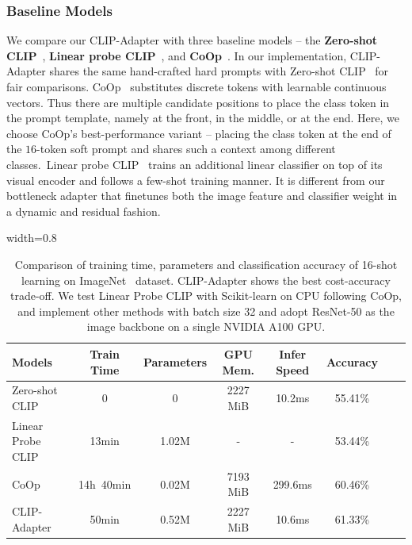 \documentclass[default,iicol]{sn-jnl}%
\theoremstyle{thmstyleone}%
\theoremstyle{thmstyletwo}%
\theoremstyle{thmstylethree}%
\begin{document}
\subsubsection{Baseline Models}
We compare our CLIP-Adapter with three baseline models -- the \textbf{Zero-shot CLIP}~\cite{radford2021learning}, \textbf{Linear probe CLIP}~\cite{radford2021learning}, and \textbf{CoOp}~\cite{zhou2021coop}. In our implementation, CLIP-Adapter shares the same hand-crafted hard prompts with Zero-shot CLIP~\cite{radford2021learning} for fair comparisons. CoOp~\cite{zhou2021coop} substitutes discrete tokens with learnable continuous vectors. Thus there are multiple candidate positions to place the class token in the prompt template, namely at the front, in the middle, or at the end. Here, we choose CoOp's best-performance variant -- placing the class token at the end of the $16$-token soft prompt and shares such a context among different classes.~Linear probe CLIP~\cite{radford2021learning} trains an additional linear classifier on top of its visual encoder and follows a few-shot training manner. It is different from our bottleneck adapter that finetunes both the image feature and classifier weight in a dynamic and residual fashion.


\begin{table}[ht]
\centering
\caption{Comparison of training time, parameters and classification accuracy of 16-shot learning on ImageNet~\cite{deng2009imagenet} dataset. CLIP-Adapter shows the best cost-accuracy trade-off. We test Linear Probe CLIP with Scikit-learn on CPU following CoOp, and implement other methods with batch size 32 and adopt ResNet-50 as the image backbone on a single NVIDIA A100 GPU.}
\vspace*{5pt}
\begin{adjustbox}{width=0.8\linewidth}
	\begin{tabular}{lccccccc}
	\toprule
		Models & Train Time & Parameters &GPU Mem. & Infer Speed & Accuracy\\ 
		\midrule
		Zero-shot CLIP  & 0 & 0 &2227 MiB &10.2ms & 55.41\%\\
		Linear Probe CLIP & 13min & 1.02M &-&- & 53.44\%\\
		CoOp  & 14h\ 40min & 0.02M &7193 MiB &299.6ms & 60.46\%\\
		CLIP-Adapter & 50min & 0.52M &2227 MiB &10.6ms & 61.33\% \\
	\bottomrule
	\end{tabular}
\end{adjustbox}
\label{time}
\end{table}
\end{document}
